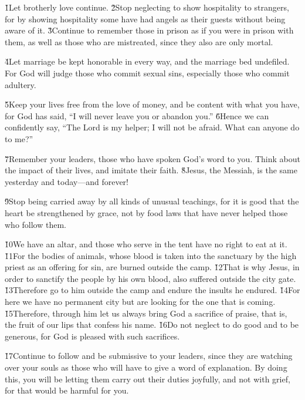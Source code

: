 \v{1}Let brotherly love continue. \v{2}Stop neglecting to show hospitality to strangers, for by showing hospitality some have had angels as their guests without being aware of it. \v{3}Continue to remember those in prison as if you were in prison with them, as well as those who are mistreated, since they also are only mortal.

\v{4}Let marriage be kept honorable in every way, and the marriage bed undefiled. For God will judge those who commit sexual sins, especially those who commit adultery.

\v{5}Keep your lives free from the love of money, and be content with what you have, for God has said, ``I will never leave you or abandon you.'' \v{6}Hence we can confidently say, ``The Lord is my helper; I will not be afraid. What can anyone do to me?''

\v{7}Remember your leaders, those who have spoken God's word to you. Think about the impact of their lives, and imitate their faith. \v{8}Jesus, the Messiah, is the same yesterday and today---and forever!

\v{9}Stop being carried away by all kinds of unusual teachings, for it is good that the heart be strengthened by grace, not by food laws that have never helped those who follow them.

\v{10}We have an altar, and those who serve in the tent have no right to eat at it. \v{11}For the bodies of animals, whose blood is taken into the sanctuary by the high priest as an offering for sin, are burned outside the camp. \v{12}That is why Jesus, in order to sanctify the people by his own blood, also suffered outside the city gate. \v{13}Therefore go to him outside the camp and endure the insults he endured. \v{14}For here we have no permanent city but are looking for the one that is coming. \v{15}Therefore, through him let us always bring God a sacrifice of praise, that is, the fruit of our lips that confess his name. \v{16}Do not neglect to do good and to be generous, for God is pleased with such sacrifices.

\v{17}Continue to follow and be submissive to your leaders, since they are watching over your souls as those who will have to give a word of explanation. By doing this, you will be letting them carry out their duties joyfully, and not with grief, for that would be harmful for you.

